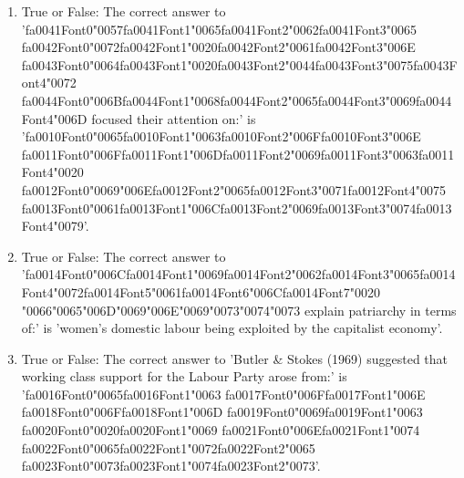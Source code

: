 \documentclass[12pt]{article}
\begin{document}
\begin{enumerate}[label=\arabic*.]
\item True or False: The correct answer to '{\csname fa0041Font0\endcsname\char"0057}{\csname fa0041Font1\endcsname\char"0065}{\csname fa0041Font2\endcsname\char"0062}{\csname fa0041Font3\endcsname\char"0065} {\csname fa0042Font0\endcsname\char"0072}{\csname fa0042Font1\endcsname\char"0020}{\csname fa0042Font2\endcsname\char"0061}{\csname fa0042Font3\endcsname\char"006E} {\csname fa0043Font0\endcsname\char"0064}{\csname fa0043Font1\endcsname\char"0020}{\csname fa0043Font2\endcsname\char"0044}{\csname fa0043Font3\endcsname\char"0075}{\csname fa0043Font4\endcsname\char"0072} {\csname fa0044Font0\endcsname\char"006B}{\csname fa0044Font1\endcsname\char"0068}{\csname fa0044Font2\endcsname\char"0065}{\csname fa0044Font3\endcsname\char"0069}{\csname fa0044Font4\endcsname\char"006D} focused their attention on:' is '{\csname fa0010Font0\endcsname\char"0065}{\csname fa0010Font1\endcsname\char"0063}{\csname fa0010Font2\endcsname\char"006F}{\csname fa0010Font3\endcsname\char"006E} {\csname fa0011Font0\endcsname\char"006F}{\csname fa0011Font1\endcsname\char"006D}{\csname fa0011Font2\endcsname\char"0069}{\csname fa0011Font3\endcsname\char"0063}{\csname fa0011Font4\endcsname\char"0020} {\csname fa0012Font0\endcsname\char"0069}{\char"006E}{\csname fa0012Font2\endcsname\char"0065}{\csname fa0012Font3\endcsname\char"0071}{\csname fa0012Font4\endcsname\char"0075} {\csname fa0013Font0\endcsname\char"0061}{\csname fa0013Font1\endcsname\char"006C}{\csname fa0013Font2\endcsname\char"0069}{\csname fa0013Font3\endcsname\char"0074}{\csname fa0013Font4\endcsname\char"0079}'.
\item True or False: The correct answer to '{\csname fa0014Font0\endcsname\char"006C}{\csname fa0014Font1\endcsname\char"0069}{\csname fa0014Font2\endcsname\char"0062}{\csname fa0014Font3\endcsname\char"0065}{\csname fa0014Font4\endcsname\char"0072}{\csname fa0014Font5\endcsname\char"0061}{\csname fa0014Font6\endcsname\char"006C}{\csname fa0014Font7\endcsname\char"0020} {\char"0066}{\char"0065}{\char"006D}{\char"0069}{\char"006E}{\char"0069}{\char"0073}{\char"0074}{\char"0073} explain patriarchy in terms of:' is 'women's domestic labour being exploited by the capitalist economy'.
\item True or False: The correct answer to 'Butler \& Stokes (1969) suggested that working class support for the Labour Party arose from:' is '{\csname fa0016Font0\endcsname\char"0065}{\csname fa0016Font1\endcsname\char"0063} {\csname fa0017Font0\endcsname\char"006F}{\csname fa0017Font1\endcsname\char"006E} {\csname fa0018Font0\endcsname\char"006F}{\csname fa0018Font1\endcsname\char"006D} {\csname fa0019Font0\endcsname\char"0069}{\csname fa0019Font1\endcsname\char"0063} {\csname fa0020Font0\endcsname\char"0020}{\csname fa0020Font1\endcsname\char"0069} {\csname fa0021Font0\endcsname\char"006E}{\csname fa0021Font1\endcsname\char"0074} {\csname fa0022Font0\endcsname\char"0065}{\csname fa0022Font1\endcsname\char"0072}{\csname fa0022Font2\endcsname\char"0065} {\csname fa0023Font0\endcsname\char"0073}{\csname fa0023Font1\endcsname\char"0074}{\csname fa0023Font2\endcsname\char"0073}'.

\end{enumerate}
\end{document}
